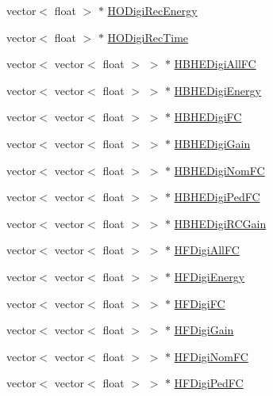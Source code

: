\begin{DoxyCompactItemize}
\item 
vector$<$ float $>$ $\ast$ \hyperlink{class_hcal_tuple_tree_a74256e07cba2a77b6d96c50e5dbcab2f}{H\+O\+Digi\+Rec\+Energy}
\item 
vector$<$ float $>$ $\ast$ \hyperlink{class_hcal_tuple_tree_a518d0a94b9cc0ca05a72210dd907a932}{H\+O\+Digi\+Rec\+Time}
\item 
vector$<$ vector$<$ float $>$ $>$ $\ast$ \hyperlink{class_hcal_tuple_tree_a5dc5cdeb59f28eaa2308daa56474c892}{H\+B\+H\+E\+Digi\+All\+F\+C}
\item 
vector$<$ vector$<$ float $>$ $>$ $\ast$ \hyperlink{class_hcal_tuple_tree_ae64aeab5ce5b05e5b0e8c140bba901b1}{H\+B\+H\+E\+Digi\+Energy}
\item 
vector$<$ vector$<$ float $>$ $>$ $\ast$ \hyperlink{class_hcal_tuple_tree_a9146017ce5694aaa1c4616e06218c39c}{H\+B\+H\+E\+Digi\+F\+C}
\item 
vector$<$ vector$<$ float $>$ $>$ $\ast$ \hyperlink{class_hcal_tuple_tree_a2bb6e71cd46bf0e2fdbccce0d141d506}{H\+B\+H\+E\+Digi\+Gain}
\item 
vector$<$ vector$<$ float $>$ $>$ $\ast$ \hyperlink{class_hcal_tuple_tree_aa829f8de833074383a9758072440a572}{H\+B\+H\+E\+Digi\+Nom\+F\+C}
\item 
vector$<$ vector$<$ float $>$ $>$ $\ast$ \hyperlink{class_hcal_tuple_tree_a75ddbcd15a6c3c15370257f4e18f93dc}{H\+B\+H\+E\+Digi\+Ped\+F\+C}
\item 
vector$<$ vector$<$ float $>$ $>$ $\ast$ \hyperlink{class_hcal_tuple_tree_acbd3f4798c9bd4c991a537d4658eb96e}{H\+B\+H\+E\+Digi\+R\+C\+Gain}
\item 
vector$<$ vector$<$ float $>$ $>$ $\ast$ \hyperlink{class_hcal_tuple_tree_ae9cf3812ae649b0941182c185eb6a721}{H\+F\+Digi\+All\+F\+C}
\item 
vector$<$ vector$<$ float $>$ $>$ $\ast$ \hyperlink{class_hcal_tuple_tree_af4208c69d37152cef6fff1c1dd026155}{H\+F\+Digi\+Energy}
\item 
vector$<$ vector$<$ float $>$ $>$ $\ast$ \hyperlink{class_hcal_tuple_tree_ac47c0113b05b20cdee0a28017cd08724}{H\+F\+Digi\+F\+C}
\item 
vector$<$ vector$<$ float $>$ $>$ $\ast$ \hyperlink{class_hcal_tuple_tree_abc594e1718c4ca609859b9c5da187ce9}{H\+F\+Digi\+Gain}
\item 
vector$<$ vector$<$ float $>$ $>$ $\ast$ \hyperlink{class_hcal_tuple_tree_a237a14d107a2090e46f21ffe7500123d}{H\+F\+Digi\+Nom\+F\+C}
\item 
vector$<$ vector$<$ float $>$ $>$ $\ast$ \hyperlink{class_hcal_tuple_tree_a66aa7dc7b2ca36a103449a29aa6af319}{H\+F\+Digi\+Ped\+F\+C}

\end{DoxyCompactItemize}
